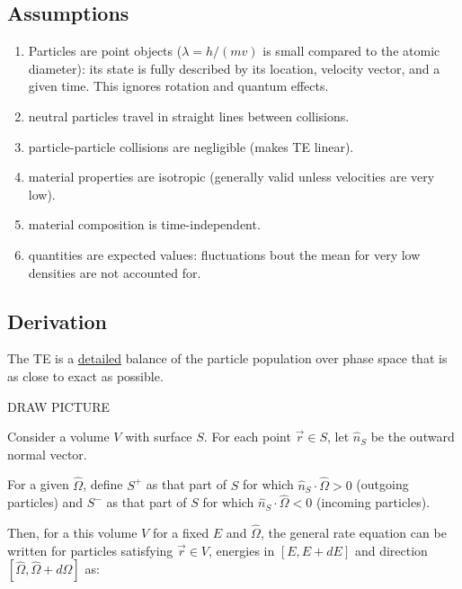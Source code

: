 \documentclass[12pt]{article}
\newcommand{\vOmega}{\ensuremath{\hat{\Omega}}}
\begin{document}
\subsection{Assumptions}
\begin{enumerate}
\item Particles are point objects ($\lambda = h/(mv)$ is small compared to the atomic diameter): its state is fully described by its location, velocity vector, and a given time. This ignores rotation and quantum effects.

\item neutral particles travel in straight lines between collisions.

\item particle-particle collisions are negligible (makes TE linear).

\item material properties are isotropic (generally valid unless velocities are very low).

\item material composition is time-independent.

\item quantities are expected values: fluctuations bout the mean for very low densities are not accounted for.
\end{enumerate}


\subsection{Derivation}
The TE is a \underline{detailed} balance of the particle population over phase space that is as close to exact as possible. 

DRAW PICTURE

Consider a volume $V$ with surface $S$. For each point $\vec{r} \in S$, let $\hat{n}_S$ be the outward normal vector.

For a given $\vOmega$, define $S^+$ as that part of $S$ for which $\hat{n}_S \cdot \vOmega > 0$ (outgoing particles) and $S^-$ as that part of $S$ for which $\hat{n}_S \cdot \vOmega < 0$ (incoming particles).

Then, for a this volume $V$ for a fixed $E$ and $\vOmega$, the general rate equation can be written for particles satisfying $\vec{r} \in V$, energies in $[E, E+dE]$ and direction $[\vOmega, \vOmega + d\vOmega]$ as:

\hspace*{3 em} 
\end{document}
